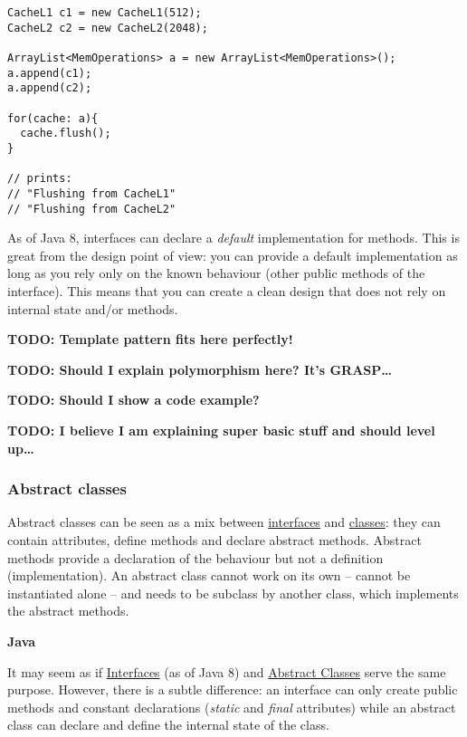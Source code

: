 \documentclass[]{article}
\begin{document}
\begin{verbatim}
CacheL1 c1 = new CacheL1(512);
CacheL2 c2 = new CacheL2(2048);

ArrayList<MemOperations> a = new ArrayList<MemOperations>();
a.append(c1);
a.append(c2);

for(cache: a){
  cache.flush();
}

// prints:
// "Flushing from CacheL1"
// "Flushing from CacheL2"
\end{verbatim}

As of Java 8, interfaces can declare a \emph{default} implementation for
methods. This is great from the design point of view: you can provide a
default implementation as long as you rely only on the known behaviour
(other public methods of the interface). This means that you can create
a clean design that does not rely on internal state and/or methods.

\textbf{TODO: Template pattern fits here perfectly!}

\textbf{TODO: Should I explain polymorphism here? It's GRASP\ldots{}}

\textbf{TODO: Should I show a code example?}

\textbf{TODO: I believe I am explaining super basic stuff and should
level up\ldots{}}

\hypertarget{abstract-classes}{\subsubsection{Abstract
classes}\label{abstract-classes}}

Abstract classes can be seen as a mix between
\protect\hyperlink{interfaces}{interfaces} and
\protect\hyperlink{classes}{classes}: they can contain attributes,
define methods and declare abstract methods. Abstract methods provide a
declaration of the behaviour but not a definition (implementation). An
abstract class cannot work on its own -- cannot be instantiated alone --
and needs to be subclass by another class, which implements the abstract
methods.

\textbf{Java}

It may seem as if \protect\hyperlink{interfaces}{Interfaces} (as of Java
8) and \protect\hyperlink{abstract-classes}{Abstract Classes} serve the
same purpose. However, there is a subtle difference: an interface can
only create public methods and constant declarations (\emph{static} and
\emph{final} attributes) while an abstract class can declare and define
the internal state of the class.
\end{document}
